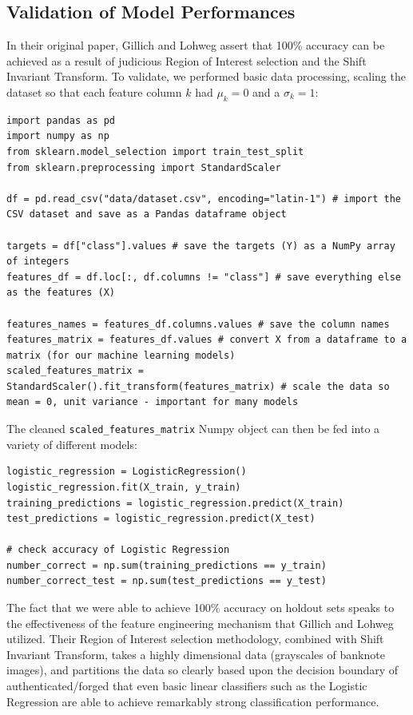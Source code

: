 \documentclass{article}
\begin{document}
\subsection{Validation of Model Performances}
In their original paper, Gillich and Lohweg assert that 100\% accuracy can be achieved as a result of judicious Region of Interest selection and the Shift Invariant Transform. To validate, we performed basic data processing, scaling the dataset so that each feature column $k$ had $\mu_{k} = 0$ and a $\sigma_{k} = 1$:
\newline\newline
\begin{lstlisting}
import pandas as pd
import numpy as np
from sklearn.model_selection import train_test_split
from sklearn.preprocessing import StandardScaler

df = pd.read_csv("data/dataset.csv", encoding="latin-1") # import the CSV dataset and save as a Pandas dataframe object
    
targets = df["class"].values # save the targets (Y) as a NumPy array of integers
features_df = df.loc[:, df.columns != "class"] # save everything else as the features (X)
    
features_names = features_df.columns.values # save the column names
features_matrix = features_df.values # convert X from a dataframe to a matrix (for our machine learning models)
scaled_features_matrix = StandardScaler().fit_transform(features_matrix) # scale the data so mean = 0, unit variance - important for many models
\end{lstlisting}
The cleaned \lstinline{scaled_features_matrix} Numpy object can then be fed into a variety of different models:
\begin{lstlisting}
logistic_regression = LogisticRegression()
logistic_regression.fit(X_train, y_train)
training_predictions = logistic_regression.predict(X_train)
test_predictions = logistic_regression.predict(X_test)

# check accuracy of Logistic Regression
number_correct = np.sum(training_predictions == y_train)
number_correct_test = np.sum(test_predictions == y_test)
\end{lstlisting}
The fact that we were able to achieve 100\% accuracy on holdout sets speaks to the effectiveness of the feature engineering mechanism that Gillich and Lohweg utilized. Their Region of Interest selection methodology, combined with Shift Invariant Transform, takes a highly dimensional data (grayscales of banknote images), and partitions the data so clearly based upon the decision boundary of authenticated/forged that even basic linear classifiers such as the Logistic Regression are able to achieve remarkably strong classification performance.
\end{document}
